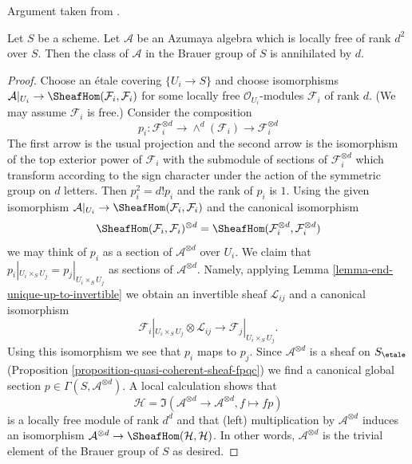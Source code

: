 \begin{lemma}
\label{lemma-annihilated-by-degree}
\begin{reference}
Argument taken from \cite{Saltman-torsion}.
\end{reference}
Let $S$ be a scheme. Let $\mathcal{A}$ be an Azumaya algebra which is
locally free of rank $d^2$ over $S$. Then the class
of $\mathcal{A}$ in the Brauer group of $S$ is annihilated by $d$.
\end{lemma}

\begin{proof}
Choose an \'etale covering $\{U_i \to S\}$ and choose isomorphisms
$\mathcal{A}|_{U_i} \to \SheafHom(\mathcal{F}_i, \mathcal{F}_i)$
for some locally free $\mathcal{O}_{U_i}$-modules $\mathcal{F}_i$
of rank $d$. (We may assume $\mathcal{F}_i$ is free.) Consider the
composition
$$
p_i : \mathcal{F}_i^{\otimes d} \to
\wedge^d(\mathcal{F}_i) \to \mathcal{F}_i^{\otimes d}
$$
The first arrow is the usual projection and the second arrow is
the isomorphism of the top exterior power of $\mathcal{F}_i$ with
the submodule of sections of $\mathcal{F}_i^{\otimes d}$ which transform
according to the sign character under the action of the symmetric group
on $d$ letters. Then $p_i^2 = d! p_i$ and the rank of $p_i$ is $1$.
Using the given isomorphism
$\mathcal{A}|_{U_i} \to \SheafHom(\mathcal{F}_i, \mathcal{F}_i)$
and the canonical isomorphism
$$
\SheafHom(\mathcal{F}_i, \mathcal{F}_i)^{\otimes d} =
\SheafHom(\mathcal{F}_i^{\otimes d}, \mathcal{F}_i^{\otimes d})
$$
we may think of $p_i$ as a section of $\mathcal{A}^{\otimes d}$
over $U_i$. We claim that $p_i|_{U_i \times_S U_j} = p_j|_{U_i \times_S U_j}$
as sections of $\mathcal{A}^{\otimes d}$. Namely, applying
Lemma \ref{lemma-end-unique-up-to-invertible}
we obtain an invertible sheaf $\mathcal{L}_{ij}$ and a canonical isomorphism
$$
\mathcal{F}_i|_{U_i \times_S U_j} \otimes \mathcal{L}_{ij}
\longrightarrow
\mathcal{F}_j|_{U_i \times_S U_j}.
$$
Using this isomorphism we see that $p_i$ maps to $p_j$.
Since $\mathcal{A}^{\otimes d}$ is a sheaf on $S_\etale$
(Proposition \ref{proposition-quasi-coherent-sheaf-fpqc}) we find a canonical
global section $p \in \Gamma(S, \mathcal{A}^{\otimes d})$. A local calculation
shows that
$$
\mathcal{H} =
\Im(\mathcal{A}^{\otimes d} \to \mathcal{A}^{\otimes d}, f \mapsto fp)
$$
is a locally free module of rank $d^d$ and that (left) multiplication
by $\mathcal{A}^{\otimes d}$ induces an isomorphism
$\mathcal{A}^{\otimes d} \to \SheafHom(\mathcal{H}, \mathcal{H})$.
In other words, $\mathcal{A}^{\otimes d}$ is the trivial element
of the Brauer group of $S$ as desired.
\end{proof}